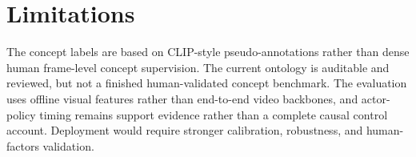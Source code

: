 \documentclass[11pt]{article}
\begin{document}
\section*{Limitations}
The concept labels are based on CLIP-style pseudo-annotations rather than dense
human frame-level concept supervision. The current ontology is auditable and
reviewed, but not a finished human-validated concept benchmark. The evaluation
uses offline visual features rather than end-to-end video backbones, and
actor-policy timing remains support evidence rather than a complete causal
control account. Deployment would require stronger calibration, robustness, and
human-factors validation.



\clearpage
\appendix

\end{document}

